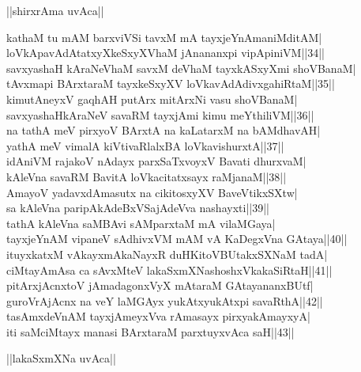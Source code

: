 \documentclass{article}
\begin{document}
\begin{center}
||shirxrAma uvAca||
\end{center}

kathaM tu mAM barxviVSi tavxM mA tayxjeYnAmaniMditAM|\\
loVkApavAdAtatxyXkeSxyXVhaM jAnananxpi vipApiniVM||34||\\
savxyashaH kAraNeVhaM savxM deVhaM tayxkASxyXmi shoVBanaM|\\
tAvxmapi BArxtaraM tayxkeSxyXV loVkavAdAdivxgahiRtaM||35||\\
kimutAneyxV gaqhAH putArx mitArxNi vasu shoVBanaM|\\
savxyashaHkAraNeV savaRM tayxjAmi kimu meYthiliVM||36||\\
na tathA meV pirxyoV BArxtA na kaLatarxM na bAMdhavAH|\\
yathA meV vimalA kiVtivaRlalxBA loVkavishurxtA||37||\\
idAniVM rajakoV nAdayx parxSaTxvoyxV Bavati dhurxvaM|\\
kAleVna savaRM BavitA loVkacitatxsayx raMjanaM||38||\\
AmayoV yadavxdAmasutx na cikitosxyXV BaveVtikxSXtw|\\
sa kAleVna paripAkAdeBxVSajAdeVva nashayxti||39||\\
tathA kAleVna saMBAvi sAMparxtaM mA vilaMGaya|\\
tayxjeYnAM vipaneV sAdhivxVM mAM vA KaDegxVna GAtaya||40||\\
ituyxkatxM vAkayxmAkaNayxR duHKitoVBUtakxSXNaM tadA|\\
ciMtayAmAsa ca sAvxMteV lakaSxmXNashoshxVkakaSiRtaH||41||\\
pitArxjAcnxtoV jAmadagonxVyX mAtaraM GAtayananxBUtf|\\
guroVrAjAcnx na veY laMGAyx yukAtxyukAtxpi savaRthA||42||\\
tasAmxdeVnAM tayxjAmeyxVva rAmasayx pirxyakAmayxyA|\\
iti saMciMtayx manasi BArxtaraM parxtuyxvAca saH||43||\\

\begin{center}
||lakaSxmXNa uvAca||
\end{center}
\end{document}
